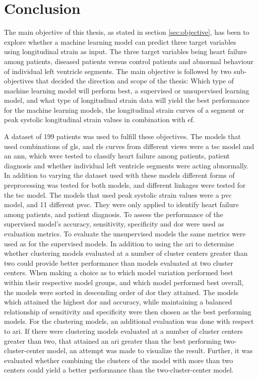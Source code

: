 \chapter{Conclusion} \label{chap:conclusion}

The main objective of this thesis, as stated in section \ref{sec:objective}, has been to explore whether a machine learning model can predict three target variables using longitudinal strain as input. The three target variables being heart failure among patients, diseased patients versus control patients and abnormal behaviour of individual left ventricle segments. The main objective is followed by two sub-objectives that decided the direction and scope of the thesis: Which type of machine learning model will perform best, a supervised or unsupervised learning model, and what type of longitudinal strain data will yield the best performance for the machine learning models, the longitudinal strain curves of a segment or peak systolic longitudinal strain values in combination with \acrshort{ef}. \bigskip

A dataset of 199 patients was used to fulfill these objectives. The models that used combinations of \acrshort{gls}, and \acrshort{rls} curves from different views were a \acrshort{tsc} model and an \acrshort{ann}, which were tested to classify heart failure among patients, patient diagnosis and whether individual left ventricle segments were acting abnormally. In addition to varying the dataset used with these models different forms of preprocessing was tested for both models, and different linkages were tested for the \acrshort{tsc} model. The models that used peak systolic strain values were a \acrshort{pvc} model, and 11 different \acrshort{pvsc}. They were only applied to identify heart failure among patients, and patient diagnosis. To assess the performance of the supervised model's accuracy, sensitivity, specificity and \acrshort{dor} were used as evaluation metrics. To evaluate the unsupervised models the same metrics were used as for the supervised models. In addition to using the \acrshort{ari} to determine whether clustering models evaluated at a number of cluster centers greater than two could provide better performance than models evaluated at two cluster centers. When making a choice as to which model variation performed best within their respective model groups, and which model performed best overall, the models were sorted in descending order of \acrshort{dor} they attained. The models which attained the highest \acrshort{dor} and accuracy, while maintaining a balanced relationship of sensitivity and specificity were then chosen as the best performing models. For the clustering models, an additional evaluation was done with respect to \acrshort{ari}. If there were clustering models evaluated at a number of cluster centers greater than two, that attained an \acrshort{ari} greater than the best performing two-cluster-center model, an attempt was made to visualize the result. Further, it was evaluated whether combining the clusters of the model with more than two centers could yield a better performance than the two-cluster-center model. \bigskip

